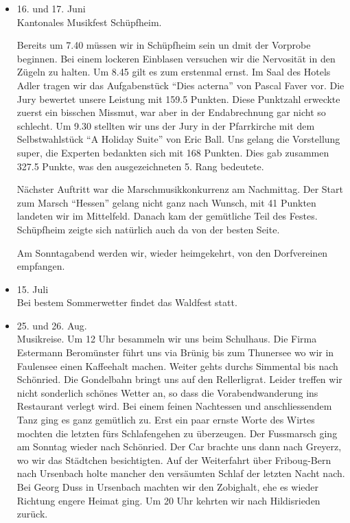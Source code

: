 \begin{history}
\begin{itemize}
        \item 16. und 17. Juni\\
              Kantonales Musikfest Schüpfheim.

              Bereits um 7.40 müssen wir
              in Schüpfheim sein un dmit der Vorprobe beginnen. Bei einem lockeren
              Einblasen versuchen wir die Nervosität in den Zügeln zu halten. Um 8.45
              gilt es zum erstenmal ernst. Im Saal des Hotels Adler tragen wir das
              Aufgabenstück \enquote{Dies acterna} von Pascal Faver vor. Die Jury
              bewertet unsere Leistung mit 159.5 Punkten. Diese Punktzahl erweckte
              zuerst ein bisschen Missmut, war aber in der Endabrechnung gar nicht so
              schlecht. Um 9.30 stellten wir uns der Jury in der Pfarrkirche mit dem
              Selbstwahlstück \enquote{A Holiday Suite} von Eric Ball. Uns gelang die
              Vorstellung super, die Experten bedankten sich mit 168 Punkten. Dies gab
              zusammen 327.5 Punkte, was den ausgezeichneten 5. Rang bedeutete.

              Nächster Auftritt war die Marschmusikkonkurrenz am Nachmittag. Der Start
              zum Marsch \enquote{Hessen} gelang nicht ganz nach Wunsch, mit 41
              Punkten landeten wir im Mittelfeld. Danach kam der gemütliche Teil des
              Festes. Schüpfheim zeigte sich natürlich auch da von der besten Seite.

              Am Sonntagabend werden wir, wieder heimgekehrt, von den Dorfvereinen
              empfangen.

        \item 15. Juli\\
              Bei bestem Sommerwetter findet das Waldfest statt.

        \item 25. und 26. Aug.\\
              Musikreise. Um 12 Uhr besammeln wir uns beim Schulhaus. Die Firma
              Estermann Beromünster führt uns via Brünig bis zum Thunersee wo wir in
              Faulensee einen Kaffeehalt machen. Weiter gehts durchs Simmental bis
              nach Schönried. Die Gondelbahn bringt uns auf den Rellerligrat. Leider
              treffen wir nicht sonderlich schönes Wetter an, so dass die
              Vorabendwanderung ins Restaurant verlegt wird. Bei einem feinen
              Nachtessen und anschliessendem Tanz ging es ganz gemütlich zu. Erst ein
              paar ernste Worte des Wirtes mochten die letzten fürs Schlafengehen zu
              überzeugen. Der Fussmarsch ging am Sonntag wieder nach Schönried. Der
              Car brachte uns dann nach Greyerz, wo wir das Städtchen besichtigten.
              Auf der Weiterfahrt über Friboug-Bern nach Ursenbach holte mancher den
              versäumten Schlaf der letzten Nacht nach. Bei Georg Duss in Ursenbach
              machten wir den Zobighalt, ehe es wieder Richtung engere Heimat ging. Um
              20 Uhr kehrten wir nach Hildisrieden zurück.


    \end{itemize}

\end{history}
